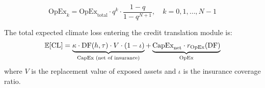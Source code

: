 \begin{equation*}
    \text{OpEx}_k = \text{OpEx}_{\text{total}} \cdot q^k \cdot \frac{1 - q}{1 - q^{N+1}}, \quad k = 0, 1, \ldots, N-1
\end{equation*}

The total expected climate loss entering the credit translation module is:
\begin{equation}
    \mathbb{E}[\text{CL}] = \underbrace{\kappa \cdot \text{DF}(h, \tau) \cdot V \cdot (1 - \iota)}_{\text{CapEx (net of insurance)}} + \underbrace{\text{CapEx}_{\text{net}} \cdot r_{\text{OpEx}}(\text{DF})}_{\text{OpEx}}
    \label{eq: total ecl}
\end{equation}
where $V$ is the replacement value of exposed assets and $\iota$ is the insurance coverage ratio.
